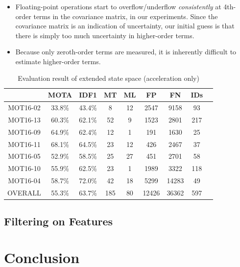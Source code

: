 \documentclass[conference]{IEEEtran}
\begin{document}
\begin{itemize}
    \item Floating-point operations start to overflow/underflow \emph{consistently} at 4th-order terms in the covariance matrix, in our experiments. Since the covariance matrix is an indication of uncertainty, our initial guess is that there is simply too much uncertainty in higher-order terms.
    \item Because only zeroth-order terms are measured, it is inherently difficult to estimate higher-order terms.
\end{itemize}

\linespread{1.2}
\begin{table}
    \caption{Evaluation result of extended state space (acceleration only)}
    \label{tab:extended-state-space}
    \begin{tabular}{ccccccccc}
        \hline
         & MOTA & IDF1 & MT & ML & FP & FN & IDs\\
        \hline
        MOT16-02 & 33.8\% & 43.4\% & 8 & 12 & 2547 & 9158 & 93\\
        MOT16-13 & 60.3\% & 62.1\% & 52 & 9 & 1523 & 2801 & 217\\
        MOT16-09 & 64.9\% & 62.4\% & 12 & 1 & 191 & 1630 & 25\\
        MOT16-11 & 68.1\% & 64.5\% & 23 & 12 & 426 & 2467 & 37\\
        MOT16-05 & 52.9\% & 58.5\% & 25 & 27 & 451 & 2701 & 58\\
        MOT16-10 & 55.9\% & 62.5\% & 23 & 1 & 1989 & 3322 & 118\\
        MOT16-04 & 58.7\% & 72.0\% & 42 & 18 & 5299 & 14283 & 49\\
        OVERALL & 55.3\% & 63.7\% & 185 & 80 & 12426 & 36362 & 597\\
        \hline
    \end{tabular}
\end{table}
\linespread{1}

\subsection{Filtering on Features}

\section{Conclusion}





\end{document}
